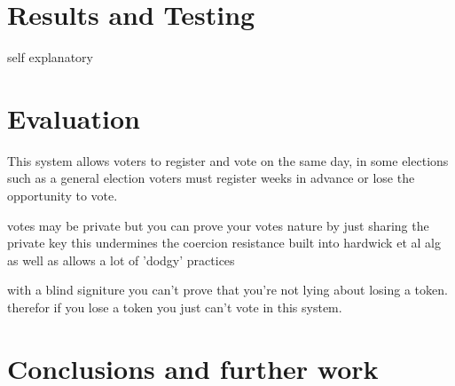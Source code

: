\documentclass{entcs}
\begin{document}
\section{Results and Testing}
self explanatory 


\section{Evaluation}
This system allows voters to register and vote on the same day, in some elections such as a general election voters must register weeks in advance or lose the opportunity to vote.

votes may be private but you can prove your votes nature by just sharing the private key this undermines the coercion resistance built into hardwick et al alg as well as allows a lot of 'dodgy' practices

with a blind signiture you can't prove that you're not lying about losing a token. therefor if you lose a token you just can't vote in this system.


\section{Conclusions and further work}
\printbibliography
\end{document}
